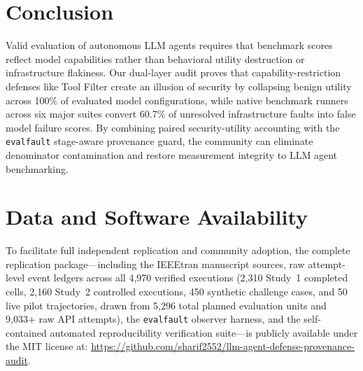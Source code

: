 \section{Conclusion}\label{sec:conclusion}

Valid evaluation of autonomous LLM agents requires that benchmark scores reflect model capabilities rather than behavioral utility destruction or infrastructure flakiness. Our dual-layer audit proves that capability-restriction defenses like Tool Filter create an illusion of security by collapsing benign utility across 100\% of evaluated model configurations, while native benchmark runners across six major suites convert 60.7\% of unresolved infrastructure faults into false model failure scores. By combining paired security-utility accounting with the \texttt{evalfault} stage-aware provenance guard, the community can eliminate denominator contamination and restore measurement integrity to LLM agent benchmarking.

\section*{Data and Software Availability}
To facilitate full independent replication and community adoption, the complete replication package---including the IEEEtran manuscript sources, raw attempt-level event ledgers across all 4,970 verified executions (2,310 Study~1 completed cells, 2,160 Study~2 controlled executions, 450 synthetic challenge cases, and 50 live pilot trajectories, drawn from 5,296 total planned evaluation units and 9,033+ raw API attempts), the \texttt{evalfault} observer harness, and the self-contained automated reproducibility verification suite---is publicly available under the MIT license at:
\url{https://github.com/sharif2552/llm-agent-defense-provenance-audit}.
